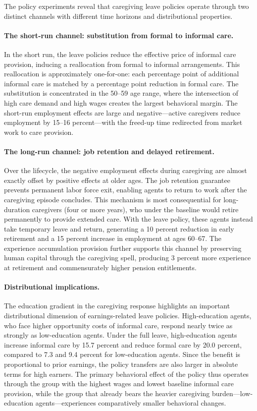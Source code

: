 The policy experiments reveal that caregiving leave policies operate through two distinct channels with different time horizons and distributional properties.

\paragraph{The short-run channel: substitution from formal to informal care.} In the short run, the leave policies reduce the effective price of informal care provision, inducing a reallocation from formal to informal arrangements. This reallocation is approximately one-for-one: each percentage point of additional informal care is matched by a percentage point reduction in formal care. The substitution is concentrated in the 50--59 age range, where the intersection of high care demand and high wages creates the largest behavioral margin. The short-run employment effects are large and negative---active caregivers reduce employment by 15--16 percent---with the freed-up time redirected from market work to care provision.

\paragraph{The long-run channel: job retention and delayed retirement.} Over the lifecycle, the negative employment effects during caregiving are almost exactly offset by positive effects at older ages. The job retention guarantee prevents permanent labor force exit, enabling agents to return to work after the caregiving episode concludes. This mechanism is most consequential for long-duration caregivers (four or more years), who under the baseline would retire permanently to provide extended care. With the leave policy, these agents instead take temporary leave and return, generating a 10 percent reduction in early retirement and a 15 percent increase in employment at ages 60--67. The experience accumulation provision further supports this channel by preserving human capital through the caregiving spell, producing 3 percent more experience at retirement and commensurately higher pension entitlements.

\paragraph{Distributional implications.} The education gradient in the caregiving response highlights an important distributional dimension of earnings-related leave policies. High-education agents, who face higher opportunity costs of informal care, respond nearly twice as strongly as low-education agents. Under the full leave, high-education agents increase informal care by 15.7 percent and reduce formal care by 20.0 percent, compared to 7.3 and 9.4 percent for low-education agents. Since the benefit is proportional to prior earnings, the policy transfers are also larger in absolute terms for high earners. The primary behavioral effect of the policy thus operates through the group with the highest wages and lowest baseline informal care provision, while the group that already bears the heavier caregiving burden---low-education agents---experiences comparatively smaller behavioral changes.

